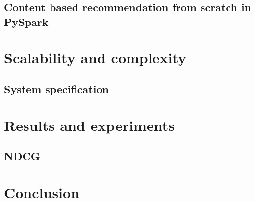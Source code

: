 \documentclass[12pt,english]{report}
\begin{document}
\section{Content based recommendation from scratch in PySpark}

\chapter{Scalability and complexity}\label{ch:scalability}
\section{System specification}
\chapter{Results and experiments}\label{ch:results}
\section{NDCG}
\chapter{Conclusion}\label{ch:conclusion}


\lstlistoflistings


\end{document}
